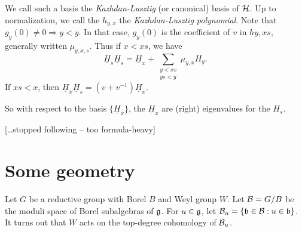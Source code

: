 \documentclass{article}
\begin{document}
We call such a basis the \emph{Kazhdan-Lusztig} (or canonical) basis of $\mathcal{H}$. Up 
to normalization, we call the $h_{y,x}$ the \emph{Kazhdan-Lusztig polynomial}. 
Note that $g_y(0)\ne 0\Rightarrow y < y$. In that case, $g_y(0)$ is the coefficient 
of $v$ in $h y, x s$, generally written $\mu_{y,x,s}$. Thus if $x<x s$, we have
\[
  \underline H_{ s} \underline H_s = \underline H_x + \sum_{\substack{y<x s \\ y s<y}} \mu_{y, x} H_y .
\]
If $x s<x$, then $\underline H_x \underline H_s = (v+v^{-1}) \underline H_x$. 

So with respect to the basis $\{\underline H_x\}$, the $\underline H_x$ are 
(right) eigenvalues for the $H_s$. 

[\ldots stopped following -- too formula-heavy]





\section{Some geometry}

Let $G$ be a reductive group with Borel $B$ and Weyl group $W$. 
Let $\mathcal{B}=G/B$ be the moduli space of Borel subalgebras of $\mathfrak{g}$. For 
$u\in \mathfrak{g}$, let $\mathcal{B}_u=\{\mathfrak{b}\in \mathcal{B}:u\in \mathfrak{b}\}$. It turns out that 
$W$ acts on the top-degree cohomology of $\mathcal{B}_u$. 
\end{document}
